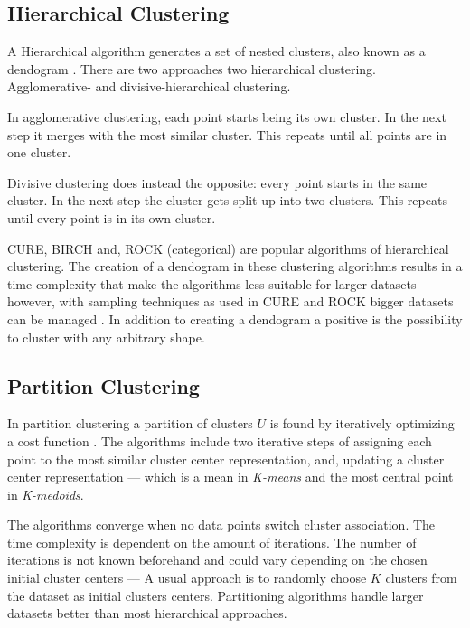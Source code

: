\documentclass[../report.tex]{subfiles}
\begin{document}
\subsection{Hierarchical Clustering}
A Hierarchical algorithm generates a set of nested clusters, also known as a dendogram \cite{Xu2015, Jain1999}. There are two approaches two hierarchical clustering. Agglomerative- and divisive-hierarchical clustering.

In agglomerative clustering, each point starts being its own cluster. In the next step it merges with the most similar cluster. This repeats until all points are in one cluster.

Divisive clustering does instead the opposite: every point starts in the same cluster. In the next step the cluster gets split up into two clusters. This repeats until every point is in its own cluster.

CURE, BIRCH and, ROCK (categorical) are popular algorithms of hierarchical clustering. The creation of a dendogram in these clustering algorithms results in a time complexity that make the algorithms less suitable for larger datasets however, with sampling techniques as used in CURE and ROCK bigger datasets can be managed \cite{Xu2015,Jain1999}. In addition to creating a dendogram a positive is the possibility to cluster with any arbitrary shape. %


\subsection{Partition Clustering}
\label{sub:part}
In partition clustering a partition of clusters $U$ is found by iteratively optimizing a cost function \cite{huang2005automated, Xu2015,Jain1999}. The algorithms include two iterative steps of assigning each point to the most similar cluster center representation, and, updating a cluster center representation --- which is a mean in \textit{K-means} and the most central point in \textit{K-medoids}.

The algorithms converge when no data points switch cluster association. The time complexity is dependent on the amount of iterations. The number of iterations is not known beforehand and could vary depending on the chosen initial cluster centers --- A usual approach is to randomly choose $K$ clusters from the dataset as initial clusters centers. Partitioning algorithms handle larger datasets better than most hierarchical approaches. 
\end{document}
